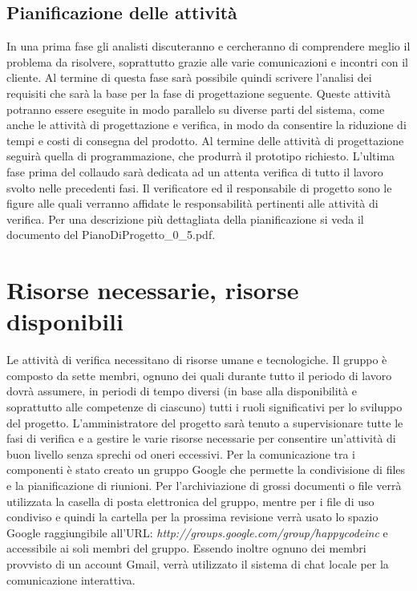 \documentclass[11pt,titlepage,a4paper]{report}
\begin{document}
\subsection{Pianificazione delle attivit\`a}
In una prima fase gli analisti discuteranno e cercheranno di comprendere meglio il problema da risolvere, soprattutto grazie alle varie comunicazioni e incontri con il cliente. Al termine di questa fase sar\`a possibile quindi scrivere l'analisi dei requisiti che sar\`a la base per la fase di progettazione seguente. Queste attivit\`a potranno essere eseguite in modo parallelo su diverse parti del sistema, come anche le attivit\`a di progettazione e verifica, in modo da consentire la riduzione di tempi e costi di consegna del prodotto. Al termine delle attivit\`a di progettazione seguir\`a quella di programmazione, che produrr\`a il prototipo richiesto. L'ultima fase prima del collaudo sar\`a dedicata ad un attenta verifica di tutto il lavoro svolto nelle precedenti fasi. Il verificatore ed il responsabile di progetto sono le figure alle quali verranno affidate le responsabilit\`a pertinenti alle attivit\`a di verifica. Per una descrizione pi\`u dettagliata della pianificazione si veda il documento del PianoDiProgetto\_0\_5.pdf.

\section{Risorse necessarie, risorse disponibili}
Le attivit\`a di verifica necessitano di risorse umane e tecnologiche. Il gruppo \`e composto da sette membri, ognuno dei quali durante tutto il periodo di lavoro dovr\`a assumere, in periodi di tempo diversi (in base alla disponibilit\`a e soprattutto alle competenze di ciascuno) tutti i ruoli significativi per lo sviluppo del progetto. L'amministratore del progetto sar\`a tenuto a supervisionare tutte le fasi di verifica e a gestire le varie risorse necessarie per consentire un'attivit\`a di buon livello senza sprechi od oneri eccessivi. Per la comunicazione tra i componenti \`e stato creato un gruppo Google che permette la condivisione di files e la pianificazione di riunioni. Per l'archiviazione di grossi documenti o file verr\`a utilizzata la casella di posta elettronica del gruppo, mentre per i file di uso condiviso e quindi la cartella per la prossima revisione verr\`a usato lo spazio Google raggiungibile all'URL: \textit{http://groups.google.com/group/happycodeinc} e accessibile ai soli membri del gruppo.
Essendo inoltre ognuno dei membri provvisto di un account Gmail, verr\`a utilizzato il sistema di chat locale per la comunicazione interattiva.
\end{document}
